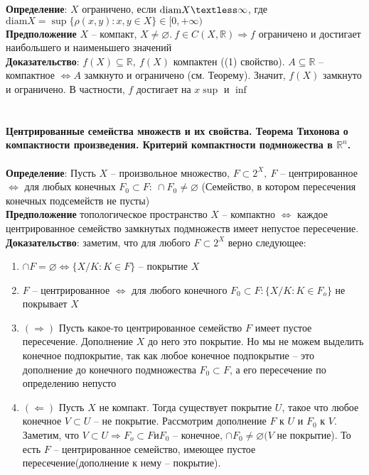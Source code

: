 	\textbf{Определение}: $X$ ограничено, если $\text{diam} X \textless \infty$, где $\text{diam} X=\sup \{\rho(x,y): x,y \in X\} \in [0,+ \infty)$\\
	\textbf{Предположение} $X$ -- компакт, $X \neq \varnothing.\ f\in C(X, \mathbb{R}) \Rightarrow f$ ограничено и достигает наибольшего и наименьшего значений\\
	\textbf{Доказательство}: $f(X) \subseteq \mathbb{R},\ f(X)$ компактен ((1) свойство). $A \subseteq \mathbb{R}$ -- компактное $\Leftrightarrow A$ замкнуто и ограничено (см. Теорему). Значит, $f(X)$ замкнуто и ограничено. В частности, $f$ достигает на $x \sup$ и $\inf$
	

\newpage
\section{}
	\textbf{Центрированные семейства множеств и их свойства. Теорема Тихонова о компактности произведения. Критерий компактности подмножества в $\mathbb{R}^n$.}\\
	\\
	\textbf{Определение}: Пусть $X$ -- произвольное множество, $F\subset 2^{X},\ F$ -- центрированное $\Leftrightarrow$ для любых конечных $F_0 \subset F:\ \cap F_0 \neq \varnothing$ (Семейство, в котором пересечения конечных подсемейств не пусты)\\
	\textbf{Предположение} топологическое пространство $X$ -- компактно $\Leftrightarrow$ каждое центрированное семейство замкнутых подмножеств имеет непустое пересечение.\\
	\textbf{Доказательство}: заметим, что для любого $F\subset 2^{X}$ верно следующее:
	\begin{enumerate}
		\item
		$\cap F=\varnothing \Leftrightarrow \{X\slash K: K \in F\}$ -- покрытие $X$
		\item
		$F$ -- центрированное $\Leftrightarrow$ для любого конечного $F_0 \subset F:\{X\slash K: K\in F_o\}$ не покрывает $X$
		\item 
		$(\Rightarrow)$ Пусть какое-то центрированное семейство $F$ имеет пустое пересечение. Дополнение $X$ до него это покрытие. Но мы не можем выделить конечное подпокрытие, так как любое конечное подпокрытие -- это дополнение до конечного подмножества $F_0 \subset F$, а его пересечение по определению непусто
		\item 
		$(\Leftarrow)$ Пусть $X$ не компакт. Тогда существует покрытие $U$, такое что любое конечное $V\subset U$ -- не покрытие. Рассмотрим дополнение $F$ к $U$ и $F_0$ к $V$. Заметим, что $V\subset U \Rightarrow F_o \subset F и F_0$ -- конечное, $\cap F_0 \neq \varnothing (V$ не покрытие). То есть $F$ -- центрированное семейство, имеющее пустое пересечение(дополнение к нему -- покрытие). 
	\end{enumerate}
